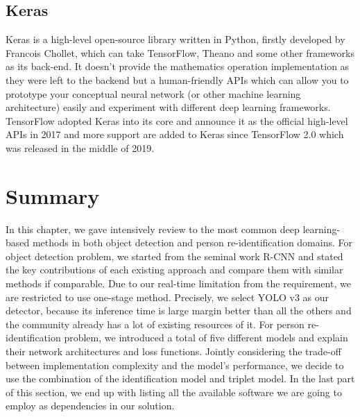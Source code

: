 \subsection{Keras}

Keras \cite{keras-framework} is a high-level open-source library written in
Python, firstly developed by Francois Chollet, which can take TensorFlow,
Theano and some other frameworks as its back-end. It doesn't provide the
mathematics operation implementation as they were left to the backend but a
human-friendly APIs which can allow you to prototype your conceptual
neural network (or other machine learning architecture) easily and experiment
with different deep learning frameworks. TensorFlow adopted Keras into its core
and announce it as the official high-level APIs in 2017 and more support are
added to Keras since TensorFlow 2.0 which was released in the middle of 2019.

\section{Summary}

In this chapter, we gave intensively review to the most common deep
learning-based methods in both object detection and person re-identification
domains.
%
For object detection problem, we started from the seminal work R-CNN
and stated the key contributions of each existing approach and compare them
with similar methods if comparable. Due to our real-time limitation from the
requirement, we are restricted to use one-stage method. Precisely, we select
YOLO v3 as our detector, because its inference time is large margin better than
all the others and the community already has a lot of existing resources of it.
%
For person re-identification problem, we introduced a total of five different models
and explain their network architectures and loss functions. Jointly considering
the trade-off between implementation complexity and the model's performance, we
decide to use the combination of the identification model and triplet model.
%
In the last part of this section, we end up with listing all the available
software we are going to employ as dependencies in our solution.

